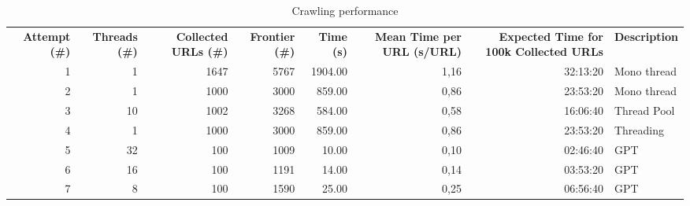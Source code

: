 \begin{table}[!ht] \centering
  \caption{Crawling performance} \label{performance}
  \begin{tabular}{rrrrrrrl}
    \textbf{Attempt (\#)} & \textbf{Threads (\#)} & \textbf{Collected URLs (\#)} & \textbf{Frontier (\#)} & \textbf{Time (s)} & \textbf{Mean Time per URL (s/URL)} & \textbf{Expected Time for 100k Collected URLs} & \textbf{Description}                                     \\
    1                     & 1                     & 1647                         & 5767                   & 1904.00           & 1,16                               & 32:13:20                                       & Mono thread                                              \\
    2                     & 1                     & 1000                         & 3000                   & 859.00            & 0,86                               & 23:53:20                                       & Mono thread                                              \\
    3                     & 10                    & 1002                         & 3268                   & 584.00            & 0,58                               & 16:06:40                                       & Thread Pool                                              \\
    4                     & 1                     & 1000                         & 3000                   & 859.00            & 0,86                               & 23:53:20                                       & Threading                                                \\
    5                     & 32                    & 100                          & 1009                   & 10.00             & 0,10                               & 02:46:40                                       & GPT                                                      \\
    6                     & 16                    & 100                          & 1191                   & 14.00             & 0,14                               & 03:53:20                                       & GPT                                                      \\
    7                     & 8                     & 100                          & 1590                   & 25.00             & 0,25                               & 06:56:40                                       & GPT                                                      \\

\end{tabular}
\end{table}
